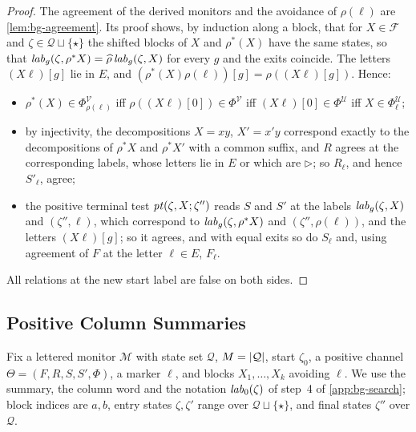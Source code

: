 \begin{proof}
The agreement of the derived monitors and the avoidance of $\rho(\ell)$ are
\cref{lem:bg-agreement}. Its proof shows, by induction along a block, that for
$X\in\mathcal F$ and $\zeta\in\mathcal Q\sqcup\{\star\}$ the shifted blocks of
$X$ and $\rho^*(X)$ have the same states, so that
$\mathit{lab}_g(\zeta,\rho^*X)=\widehat\rho\,\mathit{lab}_g(\zeta,X)$ for every $g$ and the exits
coincide. The letters $(X\ell)[g]$ lie in $E$, and
$(\rho^*(X)\rho(\ell))[g]=\rho((X\ell)[g])$. Hence:
\begin{itemize}[leftmargin=*]
\item $\rho^*(X)\in\Phi^{\mathcal V}_{\rho(\ell)}$ iff
  $\rho((X\ell)[0])\in\Phi^{\mathcal V}$ iff $(X\ell)[0]\in\Phi^{\mathcal U}$
  iff $X\in\Phi^{\mathcal U}_\ell$;
\item by injectivity, the decompositions $X=xy$, $X'=x'y$ correspond exactly to
  the decompositions of $\rho^*X$ and $\rho^*X'$ with a common suffix, and
  $R$ agrees at the corresponding labels, whose letters lie in $E$ or which are
  $\triangleright$; so $R_\ell$, and hence $S'_\ell$, agree;
\item the positive terminal test $\mathit{pt}(\zeta,X;\zeta'')$ reads $S$ and $S'$
  at the labels $\mathit{lab}_g(\zeta,X)$ and $(\zeta'',\ell)$, which correspond to
  $\mathit{lab}_g(\zeta,\rho^*X)$ and $(\zeta'',\rho(\ell))$, and the letters
  $(X\ell)[g]$; so it agrees, and with equal exits so do $S_\ell$ and, using
  agreement of $F$ at the letter $\ell\in E$, $F_\ell$.
\end{itemize}
All relations at the new start label are false on both sides.
\end{proof}

\subsection{Positive Column Summaries}\label{app:mo-columns}

Fix a lettered monitor $\mathcal M$ with state set $\mathcal Q$,
$M=\lvert \mathcal Q\rvert$, start $\zeta_0$, a positive channel
$\Theta=(F,R,S,S',\Phi)$, a marker $\ell$, and blocks $X_1,\ldots,X_k$ avoiding
$\ell$. We use the summary, the column word and the notation $\mathit{lab}_0(\zeta)$ of
step~4 of \cref{app:bg-search}; block indices are $a,b$, entry states
$\zeta,\zeta'$ range over $\mathcal Q\sqcup\{\star\}$, and final states $\zeta''$
over $\mathcal Q$.

